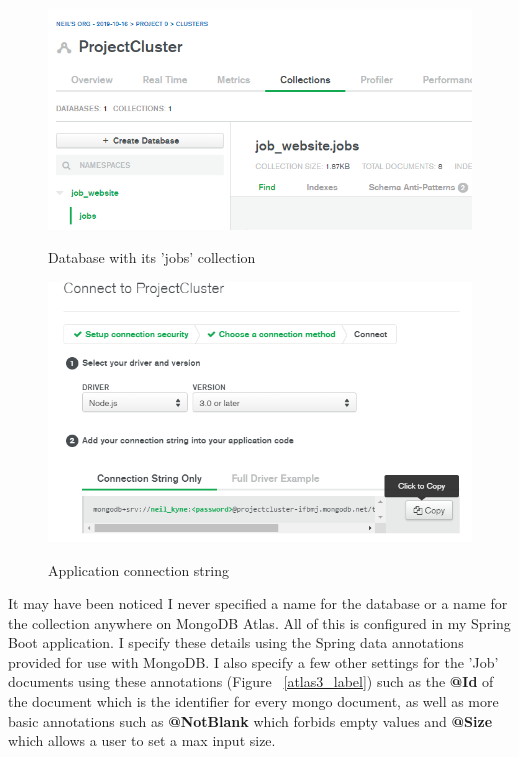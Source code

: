 \begin{figure}[h]
    \centering
    \includegraphics[scale=0.37]{Images/atlas2.png}
    \label{atlas2_label}
    \caption{Database with its 'jobs' collection}
\end{figure}
\begin{figure}[ht]
    \centering
    \includegraphics[scale=0.5]{Images/atlas.png} 
    \label{atlas1_label}
    \caption{Application connection string}
\end{figure}

It may have been noticed I never specified a name for the database or a name for the collection anywhere on MongoDB Atlas. All of this is configured in my Spring Boot application. I specify these details using the Spring data annotations provided for use with MongoDB. I also specify a few other settings for the 'Job' documents using these annotations (Figure ~\ref{atlas3_label}) such as the \textbf{@Id} of the document which is the identifier for every mongo document, as well as more basic annotations such as \textbf{@NotBlank} which forbids empty values and \textbf{@Size} which allows a user to set a max input size.

